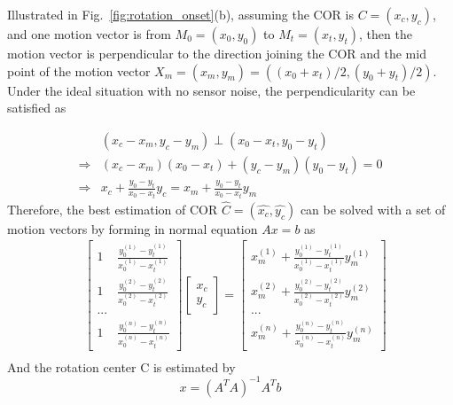 Illustrated in Fig.~\ref{fig:rotation_onset}(b), assuming the COR is $C = (x_c,y_c)$, and one motion vector is from $M_0 = (x_0,y_0)$ to $M_t = (x_t,y_t)$, then the motion vector is perpendicular to the direction joining the COR and the mid point of the motion vector $X_m = (x_m,y_m) = ((x_0+x_t)/2,(y_0+y_t)/2)$. Under the ideal situation with no sensor noise, the perpendicularity can be satisfied as

\begin{equation}
\begin{split}
    & (x_c - x_m, y_c - y_m) \perp (x_0 - x_t, y_0 - y_t) \\
    \Rightarrow & (x_c - x_m)(x_0 - x_t) + (y_c - y_m)(y_0 - y_t) = 0 \\
    \Rightarrow & x_c + \frac{y_0 - y_t}{x_0 - x_t} y_c = x_m + \frac{y_0 - y_t}{x_0 - x_t} y_m
\end{split}
\end{equation}
Therefore, the best estimation of COR $\hat{C} = (\hat{x_c}, \hat{y_c})$ can be solved with a set of motion vectors by forming in normal equation $A x = b$ as
\begin{equation}
\begin{split}
   & \left[\begin{matrix}
   1 & \frac{y^{(1)}_0 - y^{(1)}_t}{x^{(1)}_0 - x^{(1)}_t} \\
   1 & \frac{y^{(2)}_0 - y^{(2)}_t}{x^{(2)}_0 - x^{(2)}_t} \\
   ... \\
   1 & \frac{y^{(n)}_0 - y^{(n)}_t}{x^{(n)}_0 - x^{(n)}_t}
  \end{matrix} \right] 
  \left[\begin{matrix}
  x_c \\
  y_c
  \end{matrix} \right] 
  = \left[\begin{matrix}
   x^{(1)}_m + \frac{y^{(1)}_0 - y^{(1)}_t}{x^{(1)}_0 - x^{(1)}_t} y^{(1)}_m \\
   x^{(2)}_m + \frac{y^{(2)}_0 - y^{(2)}_t}{x^{(2)}_0 - x^{(2)}_t} y^{(2)}_m \\
   ... \\
   x^{(n)}_m + \frac{y^{(n)}_0 - y^{(n)}_t}{x^{(n)}_0 - x^{(n)}_t} y^{(n)}_m
  \end{matrix} \right] \\
\end{split}
\end{equation}
And the rotation center C is estimated by 
\begin{equation}
    x = (A^{T}A)^{-1}A^{T}b
\end{equation}

